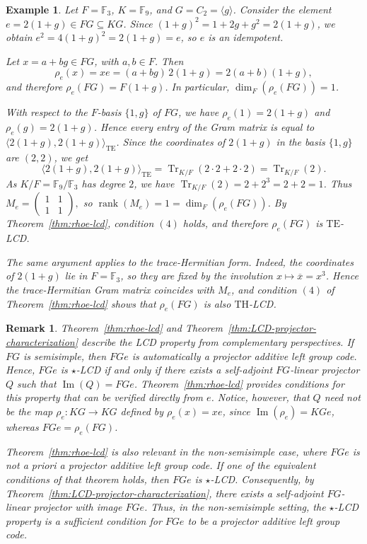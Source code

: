 \documentclass[11pt]{article}
\newtheorem{remark}[theorem]{Remark}
\newtheorem{example}[theorem]{Example}
\begin{document}
\begin{example}
Let $F=\mathbb{F}_3$, $K=\mathbb{F}_9$, and $G=C_2=\langle g\rangle$. Consider the element $e=2(1+g)\in FG\subseteq KG$. Since $(1+g)^2=1+2g+g^2=2(1+g)$, we obtain $e^2=4(1+g)^2=2(1+g)=e$, so $e$ is an idempotent.

Let $x=a+bg\in FG$, with $a,b\in F$. Then
$$
\rho_e(x)=xe=(a+bg)\,2(1+g)=2(a+b)(1+g),
$$
and therefore $\rho_e(FG)=F(1+g)$. In particular, $\dim_F(\rho_e(FG))=1$.

With respect to the $F$-basis $\{1,g\}$ of $FG$, we have $\rho_e(1)=2(1+g)$ and $\rho_e(g)=2(1+g)$. Hence every entry of the Gram matrix is equal to $\langle 2(1+g),2(1+g)\rangle_{\mathrm{TE}}$. Since the coordinates of $2(1+g)$ in the basis $\{1,g\}$ are $(2,2)$, we get
$$
\langle 2(1+g),2(1+g)\rangle_{\mathrm{TE}}
=
\operatorname{Tr}_{K/F}(2\cdot 2+2\cdot 2)
=
\operatorname{Tr}_{K/F}(2).
$$
As $K/F=\mathbb{F}_9/\mathbb{F}_3$ has degree $2$, we have $\operatorname{Tr}_{K/F}(2)=2+2^3=2+2=1$. Thus
$
M_e=
\begin{pmatrix}
1&1\\
1&1
\end{pmatrix},
$
so $\operatorname{rank}(M_e)=1=\dim_F(\rho_e(FG))$. By Theorem~\ref{thm:rhoe-lcd}, condition $(4)$ holds, and therefore $\rho_e(FG)$ is $\mathrm{TE}$-LCD.

The same argument applies to the trace-Hermitian form. Indeed, the coordinates of $2(1+g)$ lie in $F=\mathbb{F}_3$, so they are fixed by the involution $x\mapsto \overline{x}=x^3$. Hence the trace-Hermitian Gram matrix coincides with $M_e$, and condition $(4)$ of Theorem~\ref{thm:rhoe-lcd} shows that $\rho_e(FG)$ is also $\mathrm{TH}$-LCD.
\end{example}

\begin{remark}\label{rem:rhoe-lcd-and-projector-lcd}
Theorem~\ref{thm:rhoe-lcd} and
Theorem~\ref{thm:LCD-projector-characterization} describe the LCD property
from complementary perspectives. If $FG$ is semisimple, then $FGe$ is
automatically a projector additive left group code. Hence, $FGe$ is
$\star$-LCD if and only if there exists a self-adjoint $FG$-linear projector
$Q$ such that $\operatorname{Im}(Q)=FGe$. Theorem~\ref{thm:rhoe-lcd}
provides conditions for this property that can be verified directly from
$e$. Notice, however, that $Q$ need not be the map
$\rho_e:KG\longrightarrow KG$ defined by $\rho_e(x)=xe$, since
$\operatorname{Im}(\rho_e)=KGe$, whereas $FGe=\rho_e(FG)$.

Theorem~\ref{thm:rhoe-lcd} is also relevant in the non-semisimple case, where
$FGe$ is not a priori a projector additive left group code. If one of the
equivalent conditions of that theorem holds, then $FGe$ is $\star$-LCD.
Consequently, by Theorem~\ref{thm:LCD-projector-characterization}, there
exists a self-adjoint $FG$-linear projector with image $FGe$. Thus, in the
non-semisimple setting, the $\star$-LCD property is a sufficient condition
for $FGe$ to be a projector additive left group code.
\end{remark}
\end{document}
